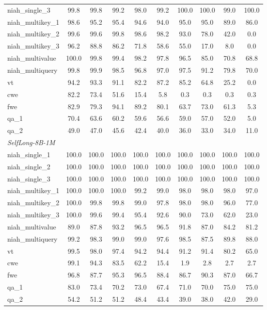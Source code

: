 \documentclass{article}
\begin{document}
\begin{table}[ht]
\begin{tabular}{lccccccccc}
niah\_single\_3 & 99.8 & 99.8 & 99.2 & 98.0 & 99.2 & 100.0 & 100.0 & 99.0 & 100.0 \\
niah\_multikey\_1 & 98.6 & 95.2 & 95.4 & 94.6 & 94.0 & 95.0 & 95.0 & 89.0 & 86.0 \\
niah\_multikey\_2 & 99.6 & 99.6 & 99.8 & 98.6 & 98.2 & 93.0 & 78.0 & 42.0 & 0.0 \\
niah\_multikey\_3 & 96.2 & 88.8 & 86.2 & 71.8 & 58.6 & 55.0 & 17.0 & 8.0 & 0.0 \\
niah\_multivalue & 100.0 & 99.8 & 99.4 & 98.2 & 97.8 & 96.5 & 85.0 & 70.8 & 68.8 \\
niah\_multiquery & 99.8 & 99.9 & 98.5 & 96.8 & 97.0 & 97.5 & 91.2 & 79.8 & 70.0 \\
vt & 94.2 & 93.3 & 91.1 & 82.2 & 87.2 & 85.2 & 64.8 & 25.2 & 0.0 \\
cwe & 82.2 & 73.4 & 51.6 & 15.4 & 5.8 & 0.3 & 0.3 & 0.3 & 0.3 \\
fwe & 82.9 & 79.3 & 94.1 & 89.2 & 80.1 & 63.7 & 73.0 & 61.3 & 5.3 \\
qa\_1 & 70.4 & 63.6 & 60.2 & 59.6 & 56.6 & 59.0 & 57.0 & 52.0 & 5.0 \\
qa\_2 & 49.0 & 47.0 & 45.6 & 42.4 & 40.0 & 36.0 & 33.0 & 34.0 & 11.0 \\ \hline
\multicolumn{10}{l}{\emph{SelfLong-8B-1M}}                                \\ \hline
niah\_single\_1 & 100.0 & 100.0 & 100.0 & 100.0 & 100.0 & 100.0 & 100.0 & 100.0 & 100.0 \\
niah\_single\_2 & 100.0 & 100.0 & 100.0 & 100.0 & 100.0 & 100.0 & 100.0 & 100.0 & 100.0 \\
niah\_single\_3 & 100.0 & 100.0 & 100.0 & 100.0 & 100.0 & 100.0 & 100.0 & 100.0 & 100.0 \\
niah\_multikey\_1 & 100.0 & 100.0 & 100.0 & 99.2 & 99.0 & 98.0 & 98.0 & 98.0 & 97.0 \\
niah\_multikey\_2 & 100.0 & 99.8 & 99.8 & 99.0 & 97.8 & 98.0 & 98.0 & 96.0 & 77.0 \\
niah\_multikey\_3 & 100.0 & 99.6 & 99.4 & 95.4 & 92.6 & 90.0 & 73.0 & 62.0 & 23.0 \\
niah\_multivalue & 89.0 & 87.8 & 93.2 & 96.5 & 96.5 & 91.8 & 87.0 & 84.2 & 81.2 \\
niah\_multiquery & 99.2 & 98.3 & 99.0 & 99.0 & 97.6 & 98.5 & 87.5 & 89.8 & 88.0 \\
vt & 99.5 & 98.0 & 97.4 & 94.2 & 94.4 & 91.2 & 91.4 & 80.2 & 65.0 \\
cwe & 99.1 & 94.3 & 83.5 & 62.2 & 15.4 & 1.9 & 2.8 & 2.7 & 2.7 \\
fwe & 96.8 & 87.7 & 95.3 & 96.5 & 88.4 & 86.7 & 90.3 & 87.0 & 66.7 \\
qa\_1 & 83.0 & 73.4 & 70.2 & 73.0 & 67.4 & 71.0 & 70.0 & 75.0 & 75.0 \\
qa\_2 & 54.2 & 51.2 & 51.2 & 48.4 & 43.4 & 39.0 & 38.0 & 42.0 & 29.0 \\ \hline
\end{tabular}
\label{tab:app_detailed_ruler}
\end{table}
\end{document}
